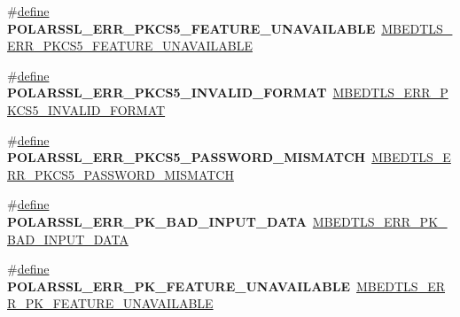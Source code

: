 \begin{DoxyCompactItemize}
\item 
\mbox{\label{compat-1_83_8h_ae557a501636e406bb37ed5f2c5fd8017}} 
\#\hyperlink{structdefine}{define} {\bfseries P\+O\+L\+A\+R\+S\+S\+L\+\_\+\+E\+R\+R\+\_\+\+P\+K\+C\+S5\+\_\+\+F\+E\+A\+T\+U\+R\+E\+\_\+\+U\+N\+A\+V\+A\+I\+L\+A\+B\+LE}~\hyperlink{pkcs5_8h_a2162372c89339c4a6da1b9d01e08ee90}{M\+B\+E\+D\+T\+L\+S\+\_\+\+E\+R\+R\+\_\+\+P\+K\+C\+S5\+\_\+\+F\+E\+A\+T\+U\+R\+E\+\_\+\+U\+N\+A\+V\+A\+I\+L\+A\+B\+LE}
\item 
\mbox{\label{compat-1_83_8h_a483cc034a7a2bc96ae1082a89d53c98d}} 
\#\hyperlink{structdefine}{define} {\bfseries P\+O\+L\+A\+R\+S\+S\+L\+\_\+\+E\+R\+R\+\_\+\+P\+K\+C\+S5\+\_\+\+I\+N\+V\+A\+L\+I\+D\+\_\+\+F\+O\+R\+M\+AT}~\hyperlink{pkcs5_8h_ab1258962a0e536ca372ee144565f108a}{M\+B\+E\+D\+T\+L\+S\+\_\+\+E\+R\+R\+\_\+\+P\+K\+C\+S5\+\_\+\+I\+N\+V\+A\+L\+I\+D\+\_\+\+F\+O\+R\+M\+AT}
\item 
\mbox{\label{compat-1_83_8h_a132ddd530ab43fa4d83923807b389f4a}} 
\#\hyperlink{structdefine}{define} {\bfseries P\+O\+L\+A\+R\+S\+S\+L\+\_\+\+E\+R\+R\+\_\+\+P\+K\+C\+S5\+\_\+\+P\+A\+S\+S\+W\+O\+R\+D\+\_\+\+M\+I\+S\+M\+A\+T\+CH}~\hyperlink{pkcs5_8h_adb5b742465ef7f4fb9f282880ceecfeb}{M\+B\+E\+D\+T\+L\+S\+\_\+\+E\+R\+R\+\_\+\+P\+K\+C\+S5\+\_\+\+P\+A\+S\+S\+W\+O\+R\+D\+\_\+\+M\+I\+S\+M\+A\+T\+CH}
\item 
\mbox{\label{compat-1_83_8h_af53e57b17f7ca55022d3b639ad0ba722}} 
\#\hyperlink{structdefine}{define} {\bfseries P\+O\+L\+A\+R\+S\+S\+L\+\_\+\+E\+R\+R\+\_\+\+P\+K\+\_\+\+B\+A\+D\+\_\+\+I\+N\+P\+U\+T\+\_\+\+D\+A\+TA}~\hyperlink{pk_8h_aab119ef4dc86ea6546472299a259bfe8}{M\+B\+E\+D\+T\+L\+S\+\_\+\+E\+R\+R\+\_\+\+P\+K\+\_\+\+B\+A\+D\+\_\+\+I\+N\+P\+U\+T\+\_\+\+D\+A\+TA}
\item 
\mbox{\label{compat-1_83_8h_a37a8bde8e3ed0443bba504a22e83045c}} 
\#\hyperlink{structdefine}{define} {\bfseries P\+O\+L\+A\+R\+S\+S\+L\+\_\+\+E\+R\+R\+\_\+\+P\+K\+\_\+\+F\+E\+A\+T\+U\+R\+E\+\_\+\+U\+N\+A\+V\+A\+I\+L\+A\+B\+LE}~\hyperlink{pk_8h_af4a79b15d48bd86c96767db4b9ce2caf}{M\+B\+E\+D\+T\+L\+S\+\_\+\+E\+R\+R\+\_\+\+P\+K\+\_\+\+F\+E\+A\+T\+U\+R\+E\+\_\+\+U\+N\+A\+V\+A\+I\+L\+A\+B\+LE}
\item 
\mbox{\label{compat-1_83_8h_a5e35817e1086ccdf611600128561281c}} 

\end{DoxyCompactItemize}
